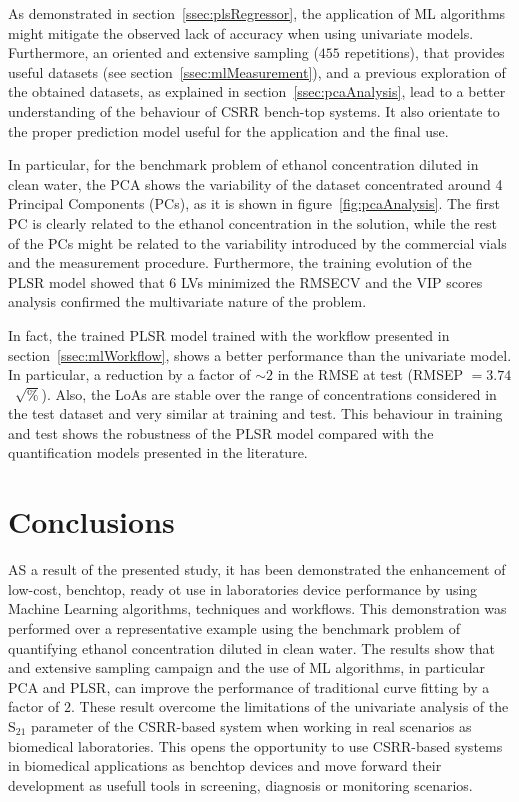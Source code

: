 \documentclass[journal,twoside,web]{ieeecolor}
\begin{document}
As demonstrated in section~\ref{ssec:plsRegressor}, the application of ML algorithms might mitigate the observed lack of accuracy when using univariate models.  Furthermore, an oriented and extensive sampling ($455$ repetitions), that provides useful datasets (see section~\ref{ssec:mlMeasurement}), and a previous exploration of the obtained datasets, as explained in section~\ref{ssec:pcaAnalysis}, lead to a better understanding of the behaviour of CSRR bench-top systems. It also orientate to the proper prediction model useful for the application and the final use.

In particular, for the benchmark problem of ethanol concentration diluted in clean water, the PCA shows the variability of the dataset concentrated around 4 Principal Components (PCs), as it is shown in figure~\ref{fig:pcaAnalysis}. The first PC is clearly related to the ethanol concentration in the solution, while the rest of the PCs might be related to the variability introduced by the commercial vials and the measurement procedure. Furthermore, the training evolution of the PLSR model showed that 6 LVs minimized the RMSECV and the VIP scores analysis confirmed the multivariate nature of the problem.
 
In fact, the trained PLSR model trained with the workflow presented in section~\ref{ssec:mlWorkflow}, shows a better performance than the univariate model. In particular, a reduction by a factor of $\sim2$ in the RMSE at test (RMSEP $=3.74$~$\sqrt{\%}$). Also, the LoAs are stable over the range of concentrations considered in the test dataset and very similar at training and test. This behaviour in training and test shows the robustness of the PLSR model compared with the quantification models presented in the literature. 

\section{Conclusions}
\label{sec:conclusion}
AS a result of the presented study, it has been demonstrated the enhancement of low-cost, benchtop, ready ot use in laboratories device performance by using Machine Learning algorithms, techniques and workflows. This demonstration was performed over a representative example using the benchmark problem of quantifying ethanol concentration diluted in clean water. The results show that and extensive sampling campaign and the use of ML algorithms, in particular PCA and PLSR, can improve the performance of traditional curve fitting by a factor of $2$.
These result overcome the limitations of the univariate analysis of the S$_{21}$ parameter of the CSRR-based system when working in real scenarios as biomedical laboratories. This opens the opportunity to use CSRR-based systems in biomedical applications as benchtop devices and move forward their development as usefull tools in screening, diagnosis or monitoring scenarios.
\end{document}
